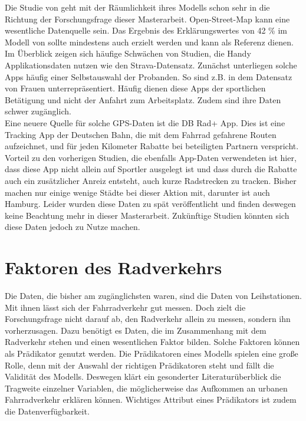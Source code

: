 \documentclass[a4paper,12pt]{thesis}
\begin{document}
Die Studie von \cite{Alattar2021} geht mit der Räumlichkeit ihres Modells schon sehr in die Richtung der Forschungsfrage dieser Masterarbeit. Open-Street-Map kann eine wesentliche Datenquelle sein. Das Ergebnis des Erklärungswertes von 42 \% im Modell von \cite{Alattar2021} sollte mindestens auch erzielt werden und kann als Referenz dienen.\\
Im Überblick zeigen sich häufige Schwächen von Studien, die Handy Applikationsdaten nutzen wie den Strava-Datensatz. Zunächst unterliegen solche Apps häufig einer Selbstauswahl der Probanden. So sind z.B. in dem Datensatz von \cite{Alattar2021} Frauen unterrepräsentiert. Häufig dienen diese Apps der sportlichen Betätigung und nicht der Anfahrt zum Arbeitsplatz. Zudem sind ihre Daten schwer zugänglich.\\
Eine neuere Quelle für solche GPS-Daten ist die DB Rad+ App. Dies ist eine Tracking App der Deutschen Bahn, die mit dem Fahrrad gefahrene Routen aufzeichnet, und für jeden Kilometer Rabatte bei beteiligten Partnern verspricht. Vorteil zu den vorherigen Studien, die ebenfalls App-Daten verwendeten ist hier, dass diese App nicht allein auf Sportler ausgelegt ist und dass durch die Rabatte auch ein zusätzlicher Anreiz entsteht, auch kurze Radstrecken zu tracken. Bisher machen nur einige wenige Städte bei dieser Aktion mit, darunter ist auch Hamburg. Leider wurden diese Daten zu spät veröffentlicht und finden deswegen keine Beachtung mehr in dieser Masterarbeit. Zukünftige Studien könnten sich diese Daten jedoch zu Nutze machen.


\section{Faktoren des Radverkehrs}

Die Daten, die bisher am zugänglichsten waren, sind die Daten von Leihstationen. Mit ihnen lässt sich der Fahrradverkehr gut messen. Doch zielt die Forschungsfrage nicht darauf ab, den Radverkehr allein zu messen, sondern ihn vorherzusagen. Dazu benötigt es Daten, die im Zusammenhang mit dem Radverkehr stehen und einen wesentlichen Faktor bilden. Solche Faktoren können als Prädikator genutzt werden. Die Prädikatoren eines Modells spielen eine große Rolle, denn mit der Auswahl der richtigen Prädikatoren steht und fällt die Validität des Modells. Deswegen klärt ein gesonderter Literaturüberblick die Tragweite einzelner Variablen, die möglicherweise das Aufkommen an urbanen Fahrradverkehr erklären können. Wichtiges Attribut eines Prädikators ist zudem die Datenverfügbarkeit. 
\end{document}
